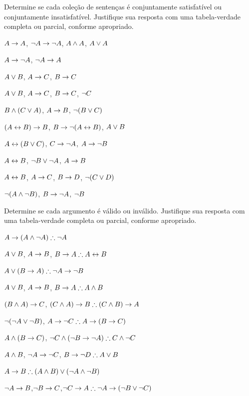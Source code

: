 \noindent\problempart
\label{pr.TT.satisfiable5}
Determine se cada coleção de sentenças é conjuntamente satisfatível ou conjuntamente insatisfatível. Justifique sua resposta com uma tabela-verdade completa ou parcial, conforme apropriado.
\begin{compactlist}
\item $A\rightarrow A$, $\neg A \rightarrow \neg A$, $A\wedge A$, $A\vee A$ %
\item $A \rightarrow \neg A$, $\neg A \rightarrow A$%
\item $A\vee B$, $A\rightarrow C$, $B\rightarrow C$ %
\item $A \vee B$, $A \rightarrow C$, $B \rightarrow C$, $\neg C$ %
\item $B\wedge(C\vee A)$, $A\rightarrow B$, $\neg(B\vee C)$  %
\item $(A \leftrightarrow B) \rightarrow B$,  $B \rightarrow \neg (A \leftrightarrow B)$, $A \vee B$  %
\item $A\leftrightarrow(B\vee C)$, $C\rightarrow \neg A$, $A\rightarrow \neg B$ %
\item  $A \leftrightarrow B$,  $\neg B \vee \neg A$,  $A \rightarrow  B$ %
\item $A \leftrightarrow B$, $A \rightarrow C$, $B \rightarrow D$, $\neg(C \vee D)$ %
\item $\neg (A \wedge \neg B)$,  $B \rightarrow \neg A$, $\neg B$   %
\end{compactlist}

\noindent\problempart Determine se cada argumento é válido ou inválido. Justifique sua resposta com uma tabela-verdade completa ou parcial, conforme apropriado.
\label{pr.TT.valid5} 
\begin{compactlist}
\item $A\eif(A\eand\enot A)\therefore \enot A$%
\item $A \vee B$, $A \rightarrow B$, $B \eif A \therefore  A \eiff B$  %
\item $A\eor(B\eif A)\therefore \enot A \eif \enot B$ %
\item $A \vee B$, $A \rightarrow B$, $ B \eif A \therefore  A \eand B$ %
\item $(B\wedge A)\rightarrow C$, $(C\eand A)\eif B\therefore (C\eand B)\eif A$ %
\item $\neg (\neg A \vee \neg B)$, $A \eif \enot C \therefore  A \eif (B \eif C)$ %
\item $A \wedge (B \rightarrow C)$, $\enot C \eand (\enot B \eif \enot A)\therefore C \eand \enot C$ %
\item $A \wedge B$, $\neg A \rightarrow \neg C$, $B \eif \enot D \therefore  A \eor B$ %
\item $A \eif B\therefore (A \eand B) \eor (\enot A \eand \enot B)$ %
\item $\neg A \rightarrow B$,$ \neg B \rightarrow C $,$ \enot C \eif A \therefore  \enot A \eif (\enot B \eor \enot C) $%

\end{compactlist}

